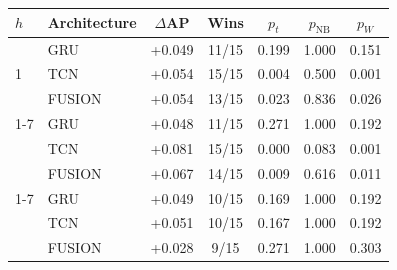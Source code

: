 \begin{tabular}{llccccc}
\toprule
$h$ & Architecture & $\Delta$AP & Wins & $p_{t}$ & $p_{\mathrm{NB}}$ & $p_{W}$ \\
\midrule
\multirow{3}{*}{1} & GRU & +0.049 & 11/15 & 0.199 & 1.000 & 0.151 \\
 & TCN & +0.054 & 15/15 & 0.004 & 0.500 & 0.001 \\
 & FUSION & +0.054 & 13/15 & 0.023 & 0.836 & 0.026 \\
\cmidrule(lr){1-7}
\multirow{3}{*}{12} & GRU & +0.048 & 11/15 & 0.271 & 1.000 & 0.192 \\
 & TCN & +0.081 & 15/15 & 0.000 & 0.083 & 0.001 \\
 & FUSION & +0.067 & 14/15 & 0.009 & 0.616 & 0.011 \\
\cmidrule(lr){1-7}
\multirow{3}{*}{24} & GRU & +0.049 & 10/15 & 0.169 & 1.000 & 0.192 \\
 & TCN & +0.051 & 10/15 & 0.167 & 1.000 & 0.192 \\
 & FUSION & +0.028 & 9/15 & 0.271 & 1.000 & 0.303 \\
\bottomrule
\end{tabular}
